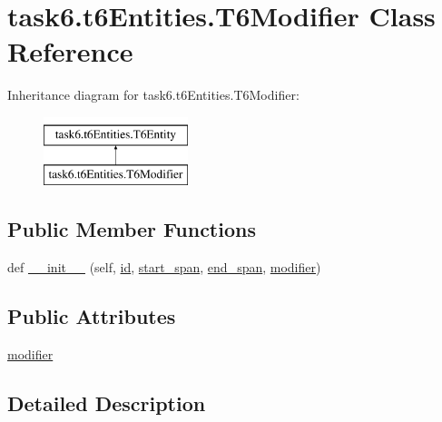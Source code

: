 \hypertarget{classtask6_1_1t6Entities_1_1T6Modifier}{}\section{task6.\+t6\+Entities.\+T6\+Modifier Class Reference}
\label{classtask6_1_1t6Entities_1_1T6Modifier}
Inheritance diagram for task6.\+t6\+Entities.\+T6\+Modifier\+:\begin{figure}[H]
\begin{center}
\leavevmode
\includegraphics[height=2.000000cm]{classtask6_1_1t6Entities_1_1T6Modifier}
\end{center}
\end{figure}
\subsection*{Public Member Functions}
\begin{DoxyCompactItemize}
\item 
def \hyperlink{classtask6_1_1t6Entities_1_1T6Modifier_a472b7516cd488b8a12e8fff5ca48d1f5}{\+\_\+\+\_\+init\+\_\+\+\_\+} (self, \hyperlink{classtask6_1_1t6Entities_1_1T6Entity_afeeced8134bb3ebe0cfecc64d0ab46a4}{id}, \hyperlink{classtask6_1_1t6Entities_1_1T6Entity_a52779e9af8864dc98e8b02fc5b9b041a}{start\+\_\+span}, \hyperlink{classtask6_1_1t6Entities_1_1T6Entity_aeb402200b156cd9562c5111dfe777b98}{end\+\_\+span}, \hyperlink{classtask6_1_1t6Entities_1_1T6Modifier_adca8df4abb0ccb35146606b8610f27a1}{modifier})
\end{DoxyCompactItemize}
\subsection*{Public Attributes}
\begin{DoxyCompactItemize}
\item 
\hyperlink{classtask6_1_1t6Entities_1_1T6Modifier_adca8df4abb0ccb35146606b8610f27a1}{modifier}
\end{DoxyCompactItemize}


\subsection{Detailed Description}


